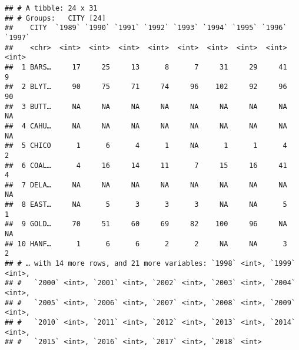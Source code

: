 \documentclass[]{article}
\newenvironment{Shaded}{\begin{snugshade}}{\end{snugshade}}
\newcommand{\CommentTok}[1]{\textcolor[rgb]{0.56,0.35,0.01}{\textit{#1}}}
\newcommand{\DataTypeTok}[1]{\textcolor[rgb]{0.13,0.29,0.53}{#1}}
\newcommand{\DecValTok}[1]{\textcolor[rgb]{0.00,0.00,0.81}{#1}}
\newcommand{\KeywordTok}[1]{\textcolor[rgb]{0.13,0.29,0.53}{\textbf{#1}}}
\newcommand{\NormalTok}[1]{#1}
\newcommand{\OperatorTok}[1]{\textcolor[rgb]{0.81,0.36,0.00}{\textbf{#1}}}
\newcommand{\StringTok}[1]{\textcolor[rgb]{0.31,0.60,0.02}{#1}}
\begin{document}
\begin{Shaded}
\end{Shaded}

\begin{verbatim}
## # A tibble: 24 x 31
## # Groups:   CITY [24]
##    CITY  `1989` `1990` `1991` `1992` `1993` `1994` `1995` `1996` `1997`
##    <chr>  <int>  <int>  <int>  <int>  <int>  <int>  <int>  <int>  <int>
##  1 BARS…     17     25     13      8      7     31     29     41      9
##  2 BLYT…     90     75     71     74     96    102     92     96     90
##  3 BUTT…     NA     NA     NA     NA     NA     NA     NA     NA     NA
##  4 CAHU…     NA     NA     NA     NA     NA     NA     NA     NA     NA
##  5 CHICO      1      6      4      1     NA      1      1      4      2
##  6 COAL…      4     16     14     11      7     15     16     41      4
##  7 DELA…     NA     NA     NA     NA     NA     NA     NA     NA     NA
##  8 EAST…     NA      5      3      3      3     NA     NA      5      1
##  9 GOLD…     70     51     60     69     82    100     96     NA     NA
## 10 HANF…      1      6      6      2      2     NA     NA      3      2
## # … with 14 more rows, and 21 more variables: `1998` <int>, `1999` <int>,
## #   `2000` <int>, `2001` <int>, `2002` <int>, `2003` <int>, `2004` <int>,
## #   `2005` <int>, `2006` <int>, `2007` <int>, `2008` <int>, `2009` <int>,
## #   `2010` <int>, `2011` <int>, `2012` <int>, `2013` <int>, `2014` <int>,
## #   `2015` <int>, `2016` <int>, `2017` <int>, `2018` <int>
\end{verbatim}
\end{document}
